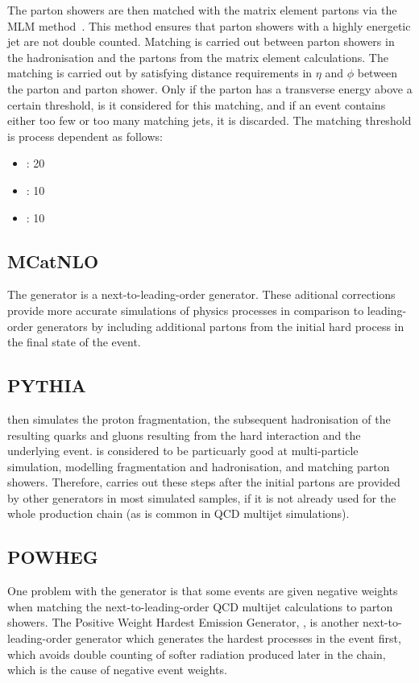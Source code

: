 The parton showers are then matched with the matrix element partons via the MLM method~\cite{mlm}. This
method ensures that parton showers with a highly energetic jet are not double counted. Matching is carried out
between parton showers in the hadronisation and the partons from the matrix element calculations. The matching
is carried out by satisfying distance requirements in $\eta$ and $\phi$ between the parton and parton shower.
Only if the parton has a transverse energy above a certain threshold, is it considered for this matching, and
if an event contains either too few or too many matching jets, it is discarded. The matching threshold is
process dependent as follows:
\begin{itemize}
  \item \ttbar: 20\GeV
  \item \WpJets: 10\GeV
  \item \ZpJets: 10\GeV
\end{itemize}

\subsection{MCatNLO}
\label{ss:mcatnlo}
The \MCATNLO \cite{mcatnlo_Frixione1, mcatnlo_Frixione2} generator is a next-to-leading-order generator. These
aditional corrections provide more accurate simulations of physics processes in comparison to leading-order
generators by including additional partons from the initial hard process in the final state of the event.

\subsection{PYTHIA}
\label{ss:pythia}
\PYTHIA \cite{pythia8} then simulates the proton fragmentation, the subsequent hadronisation of the
resulting quarks and gluons resulting from the hard interaction and the underlying event. \PYTHIA is
considered to be particuarly good at multi-particle simulation, modelling fragmentation and hadronisation, and
matching parton showers. Therefore, \PYTHIA carries out these steps after the initial partons are provided
by other generators in most simulated samples, if it is not already used for the whole production chain (as is
common in QCD multijet simulations).

\subsection{POWHEG}
\label{ss:powheg}
One problem with the \MCATNLO generator is that some events are given negative weights when matching
the next-to-leading-order QCD multijet calculations to parton showers.  The Positive Weight Hardest Emission
Generator, \POWHEG \cite{powheg_Frixione, powheg_Nason, powheg_Alioli}, is another next-to-leading-order
generator which generates the hardest processes in the event first, which avoids double counting of
softer radiation produced later in the chain, which is the cause of negative event weights.

